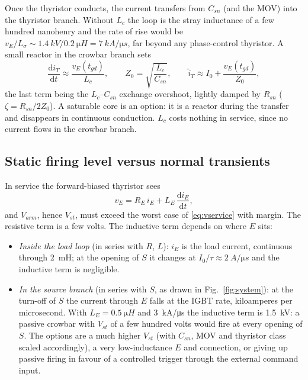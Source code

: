 \documentclass[11pt,a4paper]{article}
\begin{document}
Once the thyristor conducts, the current transfers from $C_{sn}$ (and the MOV) into the
thyristor branch. Without $L_c$ the loop is the stray inductance of a few hundred nanohenry
and the rate of rise would be
$v_E/L_\sigma \sim \SI{1.4}{kV}/\SI{0.2}{\micro H} = \SI{7}{kA/\micro s}$, far beyond any
phase-control thyristor. A small reactor in the crowbar branch sets
\begin{equation}
  \frac{\mathrm{d}i_T}{\mathrm{d}t} \approx \frac{v_E(t_{gd})}{L_c}, \qquad
  Z_0 = \sqrt{\frac{L_c}{C_{sn}}}, \qquad
  \hat{i}_T \approx I_0 + \frac{v_E(t_{gd})}{Z_0},
  \label{eq:transfer}
\end{equation}
the last term being the $L_c$--$C_{sn}$ exchange overshoot, lightly damped by $R_{sn}$
($\zeta = R_{sn}/2Z_0$). A saturable core is an option: it is a reactor during the transfer and
disappears in continuous conduction. $L_c$ costs nothing in service, since no current flows in
the crowbar branch.

\subsection{Static firing level versus normal transients}
\label{sec:vst}

In service the forward-biased thyristor sees
\begin{equation}
  v_E = R_E\, i_E + L_E\,\frac{\mathrm{d}i_E}{\mathrm{d}t},
  \label{eq:vservice}
\end{equation}
and $V_{arm}$, hence $V_{st}$, must exceed the worst case of \eqref{eq:vservice} with margin.
The resistive term is a few volts. The inductive term depends on where $E$ sits:

\begin{itemize}
\item \emph{Inside the load loop} (in series with $R$, $L$): $i_E$ is the load current, continuous
      through \SI{2}{mH}; at the opening of $S$ it changes at $I_0/\tau \approx \SI{2}{A/\micro s}$
      and the inductive term is negligible.
\item \emph{In the source branch} (in series with $S$, as drawn in Fig.~\ref{fig:system}):
      at the turn-off of $S$ the current through $E$ falls at the IGBT rate, kiloamperes per
      microsecond. With $L_E = \SI{0.5}{\micro H}$ and \SI{3}{kA/\micro s} the inductive term is
      \SI{1.5}{kV}: a passive crowbar with $V_{st}$ of a few hundred volts would fire at every
      opening of $S$. The options are a much higher $V_{st}$ (with $C_{sn}$, MOV and thyristor
      class scaled accordingly), a very low-inductance $E$ and connection, or giving up passive
      firing in favour of a controlled trigger through the external command input.
\end{itemize}
\end{document}
